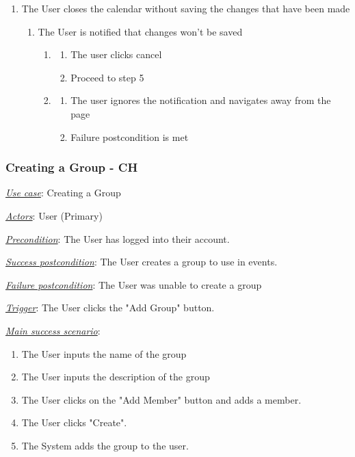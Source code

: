 \documentclass[a4paper]{article}
\begin{document}
\begin{enumerate}[label=5\alph*, leftmargin = 3em]
    \item The User closes the calendar without saving the changes that have been made 
    \begin{enumerate}[label=\arabic*.]
        \item The User is notified that changes won’t be saved
        \begin{enumerate}[label=\alph*]
            \item \begin{enumerate}[label=\arabic*.]
                \item The user clicks cancel
                \item Proceed to step 5
            \end{enumerate}
            \item \begin{enumerate}[label=\arabic*.]
                \item The user ignores the notification and navigates away from the page
                \item Failure postcondition is met
            \end{enumerate}
        \end{enumerate}
    \end{enumerate}
\end{enumerate}

\subsubsection{Creating a Group - CH}
\underline{\textit{Use case}}: Creating a Group

\underline{\textit{Actors}}: User (Primary)

\underline{\textit{Precondition}}: The User has logged into their account.

\underline{\textit{Success postcondition}}: The User creates a group to use in events.

\underline{\textit{Failure postcondition}}: The User was unable to create a group

\underline{\textit{Trigger}}: The User clicks the "Add Group" button.

\underline{\textit{Main success scenario}}: 
\begin{enumerate}[leftmargin = 3em]
    \item The User inputs the name of the group
    \item The User inputs the description of the group
    \item The User clicks on the "Add Member" button and adds a member.
    \item The User clicks "Create".
    \item The System adds the group to the user.
\end{enumerate} 
\end{document}
